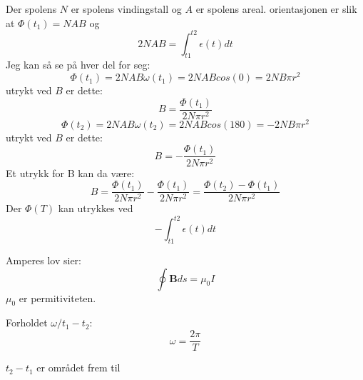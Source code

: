 \documentclass[12pt,a4paper,leqno]{report}
\begin{document}
Der spolens $N$ er spolens vindingstall og $A$ er spolens areal.
orientasjonen er slik at $\Phi(t_1)=NAB$ og 
\begin{equation}
2NAB=\int_{t1}^{t2}\epsilon(t)dt
\end{equation}
Jeg kan så se på hver del for seg:
\begin{equation}
\Phi(t_1)=2NAB\omega(t_1)=2NABcos(0)=2NB\pi r^2
\end{equation}
utrykt ved $B$ er dette:
\begin{equation}
B=\frac{\Phi(t_1)}{2N \pi r^2}
\end{equation}
\begin{equation}
\Phi(t_2)=2NAB\omega(t_2)=2NABcos(180)=-2NB\pi r^2
\end{equation}
utrykt ved $B$ er dette:
\begin{equation}
B=-\frac{\Phi(t_1)}{2N \pi r^2}
\end{equation}
Et utrykk for B kan da være:
\begin{equation}
B=\frac{\Phi(t_1)}{2N \pi r^2}-\frac{\Phi(t_1)}{2N \pi r^2}=\frac{\Phi(t_2)-\Phi(t_1)}{2N \pi r^2}
\end{equation}
Der $\Phi(T)$ kan utrykkes ved
\begin{equation}
-\int_{t1}^{t2}\epsilon(t)dt
\end{equation}

Amperes lov sier:
\begin{equation}
\oint \mathbf{B} ds=\mu_0I
\end{equation}
$\mu_0$ er permitiviteten.

Forholdet $\omega/t_1-t_2$:
\begin{equation}
\omega=\frac{2 \pi} {T}
\end{equation}



$t_2-t_1$ er området frem til 
\end{document}
